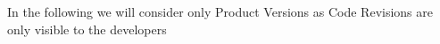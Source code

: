 In the following we will consider only Product Versions as Code Revisions are only visible to the developers







